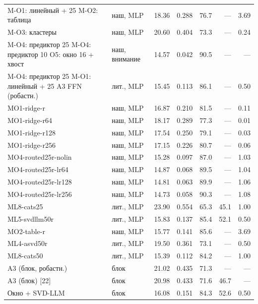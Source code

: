 \begin{tabular}{llrrrrr}
M-O1: линейный + 25%
M-O2: таблица & наш, MLP & 18.36 & 0.288 & 76.7 & — & 3.69 \\
M-O3: кластеры & наш, MLP & 20.60 & 0.404 & 73.3 & — & 0.24 \\
M-O4: предиктор 25%
M-O4: предиктор 10%
O5: окно 16 + хвост & наш, внимание & 14.57 & 0.042 & 90.5 & — & — \\
M-O4: предиктор 25%
M-O1: линейный + 25%
A3 FFN (робастн.) & лит., MLP & 15.45 & 0.113 & 86.1 & — & 0.50 \\
MO1-ridge-r & наш, MLP & 16.87 & 0.210 & 81.5 & — & 0.11 \\
MO1-ridge-r64 & наш, MLP & 18.17 & 0.289 & 77.3 & — & 0.01 \\
MO1-ridge-r128 & наш, MLP & 17.54 & 0.250 & 79.1 & — & 0.03 \\
MO1-ridge-r256 & наш, MLP & 17.15 & 0.226 & 80.7 & — & 0.06 \\
MO4-routed25r-nolin & наш, MLP & 15.28 & 0.097 & 87.0 & — & 1.03 \\
MO4-routed25r-lr64 & наш, MLP & 14.87 & 0.068 & 89.5 & — & 1.04 \\
MO4-routed25r-lr128 & наш, MLP & 14.81 & 0.063 & 89.9 & — & 1.06 \\
MO4-routed25r-lr256 & наш, MLP & 14.73 & 0.058 & 90.3 & — & 1.08 \\
ML8-cats25 & лит., MLP & 23.90 & 0.554 & 65.3 & 45.1 & 1.00 \\
ML5-svdllm50r & лит., MLP & 15.83 & 0.137 & 85.4 & 52.1 & 0.50 \\
MO2-table-r & наш, MLP & 15.77 & 0.141 & 85.6 & — & 3.69 \\
ML4-asvd50r & лит., MLP & 19.50 & 0.361 & 73.1 & — & 0.50 \\
ML8-cats50 & лит., MLP & 15.39 & 0.112 & 84.2 & — & 1.00 \\
A3 (блок, робастн.) & блок & 21.02 & 0.435 & 71.3 & — & — \\
A3 (блок) [22] & блок & 20.98 & 0.433 & 71.6 & 46.7 & — \\
Окно + SVD-LLM & блок & 16.08 & 0.151 & 84.3 & 52.6 & 0.50 \\

\end{tabular}
